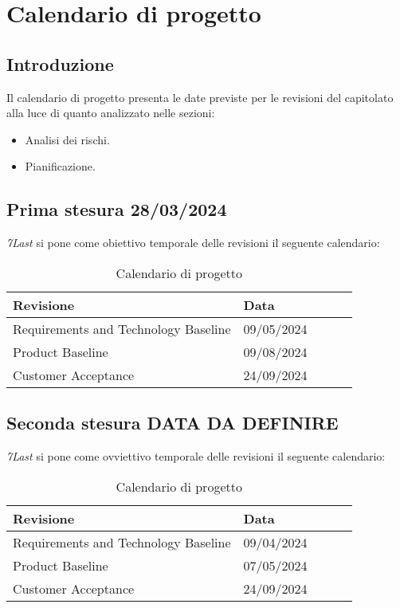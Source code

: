 \section{Calendario di progetto}
\subsection{Introduzione}
Il calendario di progetto presenta le date previste per le revisioni del capitolato alla luce di quanto analizzato nelle sezioni:
\begin{itemize}
    \item Analisi dei rischi. 
    \item Pianificazione.
\end{itemize}

\subsection{Prima stesura 28/03/2024}
\textit{7Last} si pone come obiettivo temporale delle revisioni il seguente calendario:
\begin{table}[!h]
    \begin{center}
        \begin{tabular}{ |l |l |l |l| l| }
            \hline 
            Revisione                               & Data       \\ \hline
            Requirements and Technology Baseline    & 09/05/2024 \\
            Product Baseline                        & 09/08/2024 \\
            Customer Acceptance                     & 24/09/2024 \\
            \hline
        \end{tabular}
    \end{center}
    \caption{Calendario di progetto}
    \label{tab:1}
\end{table}
\newpage

\subsection{Seconda stesura DATA DA DEFINIRE}
\textit{7Last} si pone come ovviettivo temporale delle revisioni il seguente calendario:

\begin{table}[!h]
    \begin{center}
        \begin{tabular}{ |l |l |l |l| l| }
            \hline 
            Revisione                               & Data       \\ \hline
            Requirements and Technology Baseline    & 09/04/2024 \\
            Product Baseline                        & 07/05/2024 \\
            Customer Acceptance                     & 24/09/2024 \\
            \hline
        \end{tabular}
    \end{center}
    \caption{Calendario di progetto}
    \label{tab:2}
\end{table}
